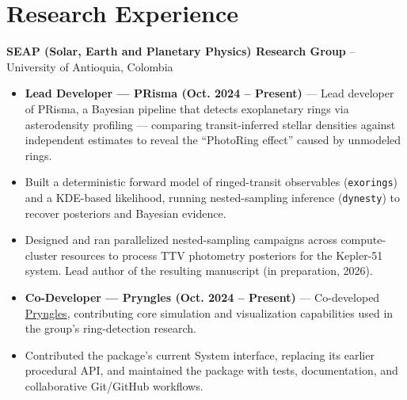 \section*{Research Experience}
\textbf{SEAP (Solar, Earth and Planetary Physics) Research Group} -- University of Antioquia, Colombia
\begin{itemize}
    \item \textbf{Lead Developer — PRisma (Oct. 2024 -- Present)} — Lead developer of PRisma, a Bayesian pipeline that detects exoplanetary rings via asterodensity profiling — comparing transit-inferred stellar densities against independent estimates to reveal the ``PhotoRing effect'' caused by unmodeled rings.
    \item Built a deterministic forward model of ringed-transit observables (\texttt{exorings}) and a KDE-based likelihood, running nested-sampling inference (\texttt{dynesty}) to recover posteriors and Bayesian evidence.
    \item Designed and ran parallelized nested-sampling campaigns across compute-cluster resources to process TTV photometry posteriors for the Kepler-51 system. Lead author of the resulting manuscript (in preparation, 2026).
    \item \textbf{Co-Developer — Pryngles (Oct. 2024 -- Present)} — Co-developed \href{https://github.com/seap-udea/pryngles}{Pryngles}, contributing core simulation and visualization capabilities used in the group's ring-detection research.
    \item Contributed the package's current System interface, replacing its earlier procedural API, and maintained the package with tests, documentation, and collaborative Git/GitHub workflows.
\end{itemize}
